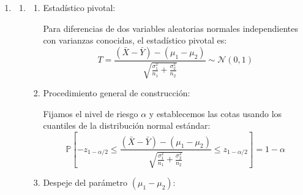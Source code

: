 \begin{enumerate}[label=\color{red}\textbf{\arabic*)}]
\begin{enumerate}[label=\color{red}\textbf{\alph*)}]
\begin{enumerate}[label=\arabic*)]
			                  El margen de error ahora depende de $S$ y de la distribución t de Student. Igualamos a la precisión deseada $\delta$: \[
				                  t_{n-1,1-\alpha / 2} \dfrac{S}{\sqrt{n} }\le \delta
			                  \]
			                  Despejamos $n$: \[
				                  \begin{array}{c}
					                  \sqrt{n}\ge \dfrac{t_{n-1,1-\alpha / 2}S}{\delta} \\
					                  n\ge \left( \dfrac{t_{n-1,1-\alpha / 2}S}{\delta} \right) ^2
				                  \end{array}
			                  \]
		            \end{enumerate}
	      \end{enumerate}
	\item {}
	      \begin{enumerate}[label=\color{red}\textbf{\alph*)}]
		      \item {}
		            \begin{enumerate}[label=\arabic*)]
			            \item Estadístico pivotal:

			                  Para diferencias de dos variables aleatorias normales independientes con varianzas conocidas, el estadístico pivotal es: \[
				                  T=\dfrac{(\bar{X}-\bar{Y})-(\mu_1-\mu_2)}{\sqrt{\frac{\sigma_1^2}{n_1} +\frac{\sigma_2^2}{n_2} } }\sim \mathcal{N}(0,1)
			                  \]
			            \item Procedimiento general de construcción:

			                  Fijamos el nivel de riesgo $\alpha$ y establecemos las cotas usando los cuantiles de la distribución normal estándar: \[
				                  \mathbb{P}\left[ -z_{1-\alpha / 2}\le \dfrac{(\bar{X}-\bar{Y})-(\mu_1-\mu_2)}{\sqrt{\frac{\sigma_1^2}{n_1} +\frac{\sigma_2^2}{n_2} } }\le z_{1-\alpha / 2} \right] =1-\alpha
			                  \]
			            \item Despeje del parámetro $(\mu_1-\mu_2)$:


\end{enumerate}
\end{enumerate}
\end{enumerate}
